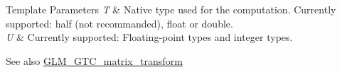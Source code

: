 \begin{DoxyTemplParams}{Template Parameters}
{\em T} & Native type used for the computation. Currently supported\+: half (not recommanded), float or double. \\
\hline
{\em U} & Currently supported\+: Floating-\/point types and integer types. \\
\hline
\end{DoxyTemplParams}
\begin{DoxySeeAlso}{See also}
\hyperlink{group__gtc__matrix__transform}{G\+L\+M\+\_\+\+G\+T\+C\+\_\+matrix\+\_\+transform} 
\end{DoxySeeAlso}
